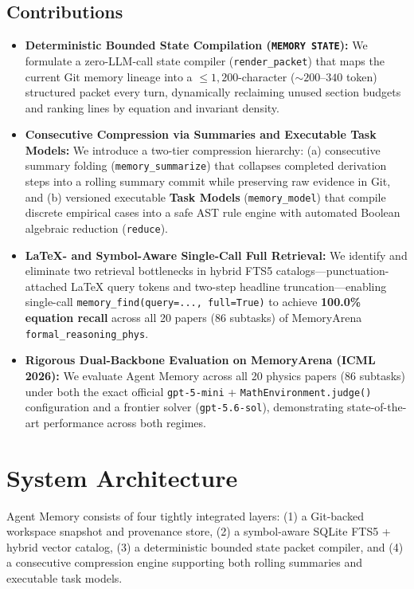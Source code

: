 \documentclass[11pt,a4paper]{article}
\begin{document}
\subsection{Contributions}
\begin{itemize}[leftmargin=1.5em]
    \item \textbf{Deterministic Bounded State Compilation (\texttt{MEMORY STATE}):} We formulate a zero-LLM-call state compiler (\texttt{render\_packet}) that maps the current Git memory lineage into a $\le 1{,}200$-character ($\sim 200$--$340$ token) structured packet every turn, dynamically reclaiming unused section budgets and ranking lines by equation and invariant density.
    \item \textbf{Consecutive Compression via Summaries and Executable Task Models:} We introduce a two-tier compression hierarchy: (a) consecutive summary folding (\texttt{memory\_summarize}) that collapses completed derivation steps into a rolling summary commit while preserving raw evidence in Git, and (b) versioned executable \textbf{Task Models} (\texttt{memory\_model}) that compile discrete empirical cases into a safe AST rule engine with automated Boolean algebraic reduction (\texttt{reduce}).
    \item \textbf{LaTeX- and Symbol-Aware Single-Call Full Retrieval:} We identify and eliminate two retrieval bottlenecks in hybrid FTS5 catalogs---punctuation-attached LaTeX query tokens and two-step headline truncation---enabling single-call \texttt{memory\_find(query=..., full=True)} to achieve \textbf{100.0\% equation recall} across all 20 papers (86 subtasks) of MemoryArena \texttt{formal\_reasoning\_phys}.
    \item \textbf{Rigorous Dual-Backbone Evaluation on MemoryArena (ICML 2026):} We evaluate Agent Memory across all 20 physics papers (86 subtasks) under both the exact official \texttt{gpt-5-mini} + \texttt{MathEnvironment.judge()} configuration and a frontier solver (\texttt{gpt-5.6-sol}), demonstrating state-of-the-art performance across both regimes.
\end{itemize}

\section{System Architecture}

Agent Memory consists of four tightly integrated layers: (1) a Git-backed workspace snapshot and provenance store, (2) a symbol-aware SQLite FTS5 + hybrid vector catalog, (3) a deterministic bounded state packet compiler, and (4) a consecutive compression engine supporting both rolling summaries and executable task models.
\end{document}

